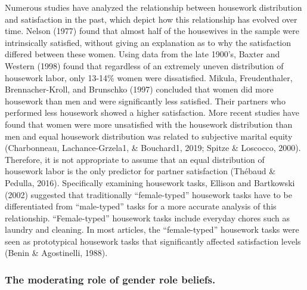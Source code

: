 \documentclass[
  english,
  man]{apa6}
\begin{document}
Numerous studies have analyzed the relationship between housework distribution and satisfaction in the past, which depict how this relationship has evolved over time. Nelson (1977) found that almost half of the housewives in the sample were intrinsically satisfied, without giving an explanation as to why the satisfaction differed between these women. Using data from the late 1900's, Baxter and Western (1998) found that regardless of an extremely uneven distribution of housework labor, only 13-14\% women were dissatisfied. Mikula, Freudenthaler, Brennacher-Kroll, and Brunschko (1997) concluded that women did more housework than men and were significantly less satisfied. Their partners who performed less housework showed a higher satisfaction. More recent studies have found that women were more unsatisfied with the housework distribution than men and equal housework distribution was related to subjective marital equity (Charbonneau, Lachance-Grzela1, \& Bouchard1, 2019; Spitze \& Loscocco, 2000). Therefore, it is not appropriate to assume that an equal distribution of housework labor is the only predictor for partner satisfaction (Thébaud \& Pedulla, 2016). Specifically examining housework tasks, Ellison and Bartkowski (2002) suggested that traditionally \enquote{female-typed} housework tasks have to be differentiated from \enquote{male-typed} tasks for a more accurate analysis of this relationship. \enquote{Female-typed} housework tasks include everyday chores such as laundry and cleaning. In most articles, the \enquote{female-typed} housework tasks were seen as prototypical housework tasks that significantly affected satisfaction levels (Benin \& Agostinelli, 1988).

\hypertarget{the-moderating-role-of-gender-role-beliefs.}{%
\subsubsection{The moderating role of gender role beliefs.}\label{the-moderating-role-of-gender-role-beliefs.}}
\end{document}
